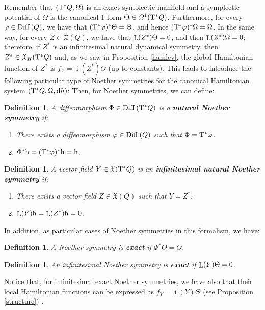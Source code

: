 \documentclass[12pt]{report}
\newtheorem{definition}[teor]{Definition}
\def\ben{\begin{enumerate}}
\def\een{\end{enumerate}}
\def\vf{\mathfrak X}
\def\df{{\mit\Omega}}
\def\d{{\rm d}}
\def\Tan{{\rm T}}
\def\Lie{\mathop{\rm L}\nolimits}
\def\inn{\mathop{i}\nolimits}
\begin{document}
Remember that $(\Tan^*Q,\Omega)$ is an exact
symplectic manifold and a symplectic  potential of $\Omega$
is the canonical $1$-form $\Theta\in\df^1(\Tan^*Q)$.
Furthermore, for every $\varphi\in{\rm Diff}\,(Q)$,
we have that $(\Tan^*\varphi)^*\Theta=\Theta$, and hence
$(\Tan^*\varphi)^*\Omega=\Omega$.
In the same way, for every $Z\in\vf(Q)$,
we have that  $\Lie(Z^*)\Theta=0$, and then  $\Lie(Z^*)\Omega=0$;
therefore, if $Z^*$ is an infinitesimal natural dynamical symmetry,
then $Z^*\in\vf_H(\Tan^*Q)$ and, as we saw in Proposition \ref{hamlev}, 
the global Hamiltonian function of $Z^*$ is $f_Z=\inn (Z^*)\Theta$ (up to constants).
This leads to introduce the following particular type of Noether symmetries
for the canonical Hamiltonian system $(\Tan^*Q,\Omega,\d h)$:
Then, for Noether symmetries, we can define:

\begin{definition}
A diffeomorphism $\Phi\in {\rm Diff}\, (\Tan^*Q)$ is a
\textbf{natural Noether symmetry} if:
\ben
\item
There exists a diffeomorphism $\varphi\in{\rm Diff}\, (Q)$ such that
$\Phi=\Tan^*\varphi$.
\item
$\Phi^*{\rm h}=(\Tan^*\varphi)^*{\rm h}={\rm h}$.
\een
\label{nCs}
\end{definition}

\begin{definition}
A vector field $Y\in\vf(\Tan^*Q)$ is an
 \textbf{infinitesimal natural Noether symmetry } if:
\ben
\item
There exists a vector field $Z\in\vf (Q)$ such that $Y=Z^*$.
\item
$\Lie(Y){\rm h}=\Lie(Z^*){\rm h}=0$.
\een
\label{nCsinf}
\end{definition}

In addition, as particular cases of Noether symmetries in this formalism, we have:

\begin{definition}
A  Noether symmetry is \textbf{exact} if $\Phi^*\Theta=\Theta$.
\label{eCs}
\end{definition}

\begin{definition}
An infinitesimal Noether symmetry is \textbf{exact} if $\Lie(Y)\Theta=0$.
\label{eCsinf}
\end{definition}

Notice that, for  infinitesimal exact Noether symmetries,
we have also that their local Hamiltonian functions can be expressed as
$f_Y=\inn(Y)\Theta$ (see Proposition \ref{structure}) .
\end{document}
